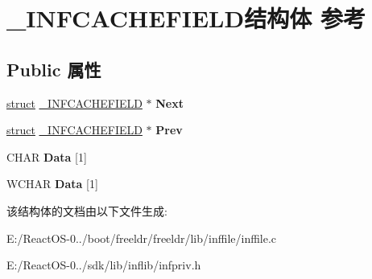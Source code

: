 \hypertarget{struct___i_n_f_c_a_c_h_e_f_i_e_l_d}{}\section{\+\_\+\+I\+N\+F\+C\+A\+C\+H\+E\+F\+I\+E\+L\+D结构体 参考}
\label{struct___i_n_f_c_a_c_h_e_f_i_e_l_d}
\subsection*{Public 属性}
\begin{DoxyCompactItemize}
\item 
\mbox{\label{struct___i_n_f_c_a_c_h_e_f_i_e_l_d_aa19f5aa3ecc3a52dc9f4f75f7f25235e}} 
\hyperlink{interfacestruct}{struct} \hyperlink{struct___i_n_f_c_a_c_h_e_f_i_e_l_d}{\+\_\+\+I\+N\+F\+C\+A\+C\+H\+E\+F\+I\+E\+LD} $\ast$ {\bfseries Next}
\item 
\mbox{\label{struct___i_n_f_c_a_c_h_e_f_i_e_l_d_ad0ebe26ac8845f4b07ce78599b2dddb4}} 
\hyperlink{interfacestruct}{struct} \hyperlink{struct___i_n_f_c_a_c_h_e_f_i_e_l_d}{\+\_\+\+I\+N\+F\+C\+A\+C\+H\+E\+F\+I\+E\+LD} $\ast$ {\bfseries Prev}
\item 
\mbox{\label{struct___i_n_f_c_a_c_h_e_f_i_e_l_d_af479f12934117a337c24ae897933d741}} 
C\+H\+AR {\bfseries Data} \mbox{[}1\mbox{]}
\item 
\mbox{\label{struct___i_n_f_c_a_c_h_e_f_i_e_l_d_ae47a940c0fa3bacfd21b0e374ccaaf54}} 
W\+C\+H\+AR {\bfseries Data} \mbox{[}1\mbox{]}
\end{DoxyCompactItemize}


该结构体的文档由以下文件生成\+:\begin{DoxyCompactItemize}
\item 
E\+:/\+React\+O\+S-\/0../boot/freeldr/freeldr/lib/inffile/inffile.\+c\item 
E\+:/\+React\+O\+S-\/0../sdk/lib/inflib/infpriv.\+h\end{DoxyCompactItemize}
